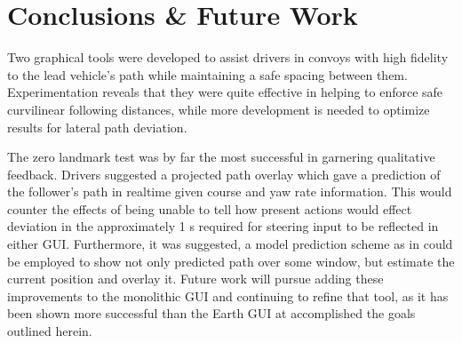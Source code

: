 \chapter{Conclusions \& Future Work} \label{chap:concl}

Two graphical tools were developed to assist drivers in convoys with high fidelity to the lead vehicle's path while maintaining a safe spacing between them. 
Experimentation reveals that they were quite effective in helping to enforce safe curvilinear following distances, while more development is needed to optimize results for lateral path deviation.

The zero landmark test was by far the most successful in garnering qualitative feedback. Drivers suggested a projected path overlay which gave a prediction of the follower's path in realtime given course and yaw rate information. This would counter the effects of being unable to tell how present actions would effect deviation in the approximately 1 s required for steering input to be reflected in either GUI. Furthermore, it was suggested, a model prediction scheme as in \cite{williamthesis} could be employed to show not only predicted path over some window, but estimate the current position and overlay it. Future work will pursue adding these improvements to the monolithic GUI and continuing to refine that tool, as it has been shown more successful than the Earth GUI at accomplished the goals outlined herein.